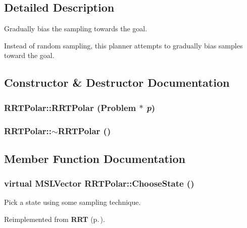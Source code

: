 \subsection{Detailed Description}
Gradually bias the sampling towards the goal.

Instead of random sampling, this planner attempts to gradually bias  samples toward the goal. 



\subsection{Constructor \& Destructor Documentation}
\subsubsection{\setlength{\rightskip}{0pt plus 5cm}RRTPolar::RRTPolar ({\bf Problem} $\ast$ {\em p})}\label{class_RRTPolar_a0}


\subsubsection{\setlength{\rightskip}{0pt plus 5cm}RRTPolar::$\sim$RRTPolar ()\hspace{0.3cm}{\tt  [inline, virtual]}}\label{class_RRTPolar_a1}




\subsection{Member Function Documentation}
\subsubsection{\setlength{\rightskip}{0pt plus 5cm}virtual {\bf MSLVector} RRTPolar::Choose\-State ()\hspace{0.3cm}{\tt  [protected, virtual]}}\label{class_RRTPolar_b0}


Pick a state using some sampling technique.



Reimplemented from {\bf RRT} {\rm (p.\,\pageref{class_RRT_b4})}.
